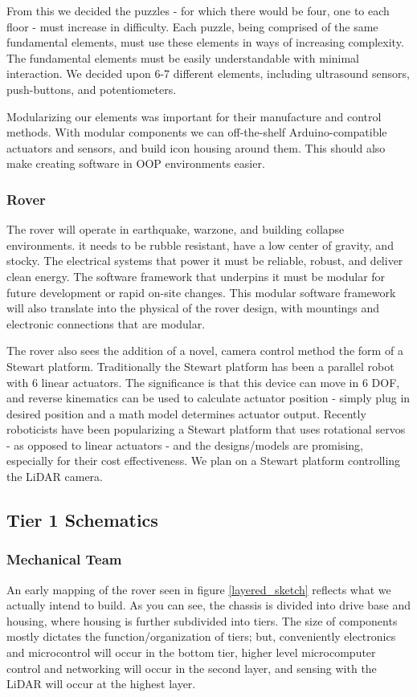 \documentclass[a4paper, 10pt]{article}
\begin{document}
		From this we decided the puzzles - for which there would be four, one to each floor - must increase in difficulty. Each puzzle, being comprised of the same fundamental elements, must use these elements in ways of increasing complexity. The fundamental elements must be easily understandable with minimal interaction. We decided upon 6-7 different elements, including ultrasound sensors, push-buttons, and potentiometers.
		
		Modularizing our elements was important for their manufacture and control methods. With modular components we can off-the-shelf Arduino-compatible actuators and sensors, and build icon housing around them. This should also make creating software in OOP environments easier. 		
		
		\subsubsection*{Rover}
		The rover will operate in earthquake, warzone, and building collapse environments. it needs to be rubble resistant, have a low center of gravity, and stocky. The electrical systems that power it must be reliable, robust, and deliver clean energy. The software framework that underpins it must be modular for future development or rapid on-site changes. This modular software framework will also translate into the physical of the rover design, with mountings and electronic connections that are modular.
		
		The rover also sees the addition of a novel, camera control method the form of a Stewart platform. Traditionally the Stewart platform has been a parallel robot with 6 linear actuators. The significance is that this device can move in 6 DOF, and reverse kinematics can be used to calculate actuator position - simply plug in desired position and a math model determines actuator output. Recently roboticists have been popularizing a Stewart platform that uses rotational servos - as opposed to linear actuators - and the designs/models are promising, especially for their cost effectiveness. We plan on a Stewart platform controlling the LiDAR camera.

	\subsection{Tier 1 Schematics}
		\subsubsection{Mechanical Team}
		An early mapping of the rover seen in figure \ref{layered_sketch} reflects what we actually intend to build. As you can see, the chassis is divided into drive base and housing, where housing is further subdivided into tiers. The size of components mostly dictates the function/organization of tiers; but, conveniently electronics and microcontrol will occur in the bottom tier, higher level microcomputer control and networking will occur in the second layer, and sensing with the LiDAR will occur at the highest layer.
		
\end{document}
